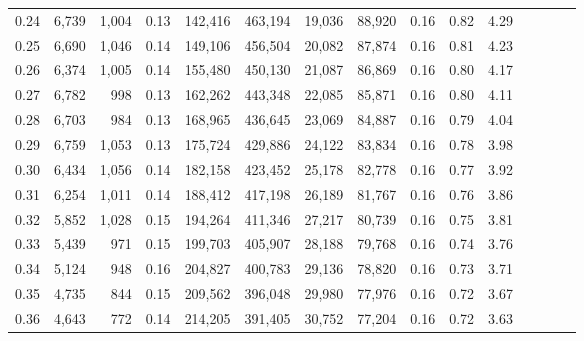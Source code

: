 \begin{tabular}{rrrcrrrrrrrrrrr}
0.24 &   6,739 &  1,004 &                                       0.13 &  142,416 &  463,194 &   19,036 &   88,920 &  0.16 &  0.82 &                         4.29 \\
0.25 &   6,690 &  1,046 &                                       0.14 &  149,106 &  456,504 &   20,082 &   87,874 &  0.16 &  0.81 &                         4.23 \\
0.26 &   6,374 &  1,005 &                                       0.14 &  155,480 &  450,130 &   21,087 &   86,869 &  0.16 &  0.80 &                         4.17 \\
0.27 &   6,782 &    998 &                                       0.13 &  162,262 &  443,348 &   22,085 &   85,871 &  0.16 &  0.80 &                         4.11 \\
0.28 &   6,703 &    984 &                                       0.13 &  168,965 &  436,645 &   23,069 &   84,887 &  0.16 &  0.79 &                         4.04 \\
0.29 &   6,759 &  1,053 &                                       0.13 &  175,724 &  429,886 &   24,122 &   83,834 &  0.16 &  0.78 &                         3.98 \\
0.30 &   6,434 &  1,056 &                                       0.14 &  182,158 &  423,452 &   25,178 &   82,778 &  0.16 &  0.77 &                         3.92 \\
0.31 &   6,254 &  1,011 &                                       0.14 &  188,412 &  417,198 &   26,189 &   81,767 &  0.16 &  0.76 &                         3.86 \\
0.32 &   5,852 &  1,028 &                                       0.15 &  194,264 &  411,346 &   27,217 &   80,739 &  0.16 &  0.75 &                         3.81 \\
0.33 &   5,439 &    971 &                                       0.15 &  199,703 &  405,907 &   28,188 &   79,768 &  0.16 &  0.74 &                         3.76 \\
0.34 &   5,124 &    948 &                                       0.16 &  204,827 &  400,783 &   29,136 &   78,820 &  0.16 &  0.73 &                         3.71 \\
0.35 &   4,735 &    844 &                                       0.15 &  209,562 &  396,048 &   29,980 &   77,976 &  0.16 &  0.72 &                         3.67 \\
0.36 &   4,643 &    772 &                                       0.14 &  214,205 &  391,405 &   30,752 &   77,204 &  0.16 &  0.72 &                         3.63 \\

\end{tabular}
